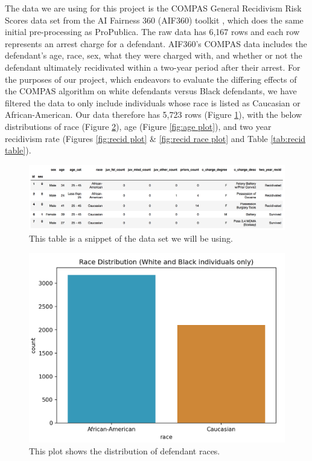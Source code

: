 \documentclass[water,article,submit,moreauthors,pdftex]{mdpi}
\begin{document}
The data we are using for this project is the COMPAS General Recidivism
Risk Scores data set from the AI Fairness 360 (AIF360) toolkit
\citep{aif360-oct-2018}, which does the same initial pre-processing as
ProPublica. The raw data has 6,167 rows and each row represents an
arrest charge for a defendant. AIF360's COMPAS data includes the
defendant's age, race, sex, what they were charged with, and whether or
not the defendant ultimately recidivated within a two-year period after
their arrest. For the purposes of our project, which endeavors to
evaluate the differing effects of the COMPAS algorithm on white
defendants versus Black defendants, we have filtered the data to only
include individuals whose race is listed as Caucasian or
African-American. Our data therefore has 5,723 rows (Figure
\ref{fig:table snip}), with the below distributions of race (Figure
\ref{fig:race plot}), age (Figure \ref{fig:age plot}), and two year
recidivism rate (Figures \ref{fig:recid plot} \&
\ref{fig:recid race plot} and Table \ref{tab:recid table}).

\begin{figure}

{\centering \includegraphics[width=1\linewidth]{../images/table_snippet} 

}

\caption{This table is a snippet of the data set we will be using.}\label{fig:table snip}
\end{figure}

\begin{figure}

{\centering \includegraphics[width=1\linewidth]{../images/race_bar_plot_new} 

}

\caption{This plot shows the distribution of defendant races.}\label{fig:race plot}
\end{figure}
\end{document}
